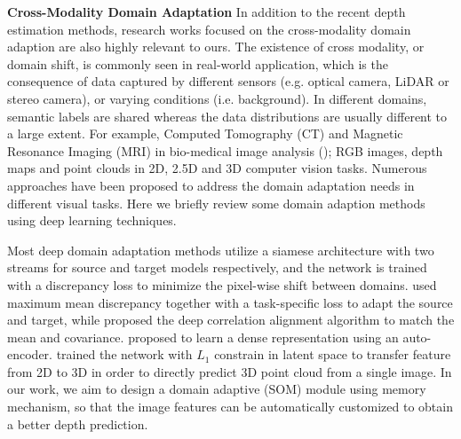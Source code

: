 \documentclass[letterpaper]{article} \usepackage{aaai20}  \usepackage{times}  \usepackage{helvet} \usepackage{courier}  \usepackage{graphicx} \frenchspacing  \setlength{\pdfpagewidth}{8.5in}  \setlength{\pdfpageheight}{11in}  \usepackage{epsfig}
\begin{document}
    \textbf{Cross-Modality Domain Adaptation} \hspace{0.3cm} In addition to the recent depth estimation methods, research works focused on the cross-modality domain adaption are also highly relevant to ours. The existence of cross modality, or domain shift, is commonly seen in real-world application, which is the consequence of data captured by different sensors (e.g. optical camera, LiDAR or stereo camera), or varying conditions (i.e. background). In different domains, semantic labels are shared whereas the data distributions are usually different to a large extent. For example, Computed Tomography (CT) and Magnetic Resonance Imaging (MRI) in bio-medical image analysis (\cite{Dou2018Unsupervised}); RGB images, depth maps and point clouds in 2D, 2.5D and 3D computer vision tasks. Numerous approaches have been proposed to address the domain adaptation needs in different visual tasks. Here we briefly review some domain adaption methods using deep learning techniques.
    
    Most deep domain adaptation methods utilize a siamese architecture with two streams for source and target models respectively, and the network is trained with a discrepancy loss to minimize the pixel-wise shift between domains. \cite{Long2015Learning} used maximum mean discrepancy together with a task-specific loss to adapt the source and target, while \cite{Sun2016Deep} proposed the deep correlation alignment algorithm to match the mean and covariance. \cite{Bloesch_2018_CVPR} proposed to learn a dense representation using an auto-encoder. \cite{Mandikal20183D} trained the network with $L_1$ constrain in latent space to transfer feature from 2D to 3D in order to directly predict 3D point cloud from a single image. In our work, we aim to design a domain adaptive (SOM) module using memory mechanism, so that the image features can be automatically customized to obtain a better depth prediction. 
   
    
\end{document}

